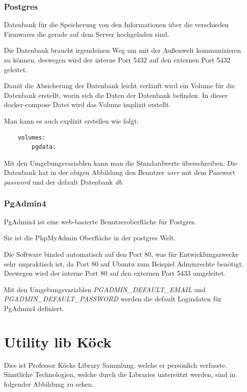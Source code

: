 \subsubsection{Postgres}

Datenbank für die Speicherung von den Informationen über die verschieden Firmwares die gerade auf dem Server hochgeladen sind.

Die Datenbank braucht irgendeinen Weg um mit der Außenwelt kommunizieren zu können, deswegen wird der interne Port 5432 auf den externen Port 5432 geleitet.

Damit die Absicherung der Datenbank leicht verläuft wird ein Volume für die Datenbank erstellt, worin sich die Daten der Datenbank befinden. In dieser docker-compose Datei wird das Volume implizit erstellt. 

Man kann es auch explizit erstellen wie folgt:

\begin{verbatim}
    volumes:
        pgdata:
\end{verbatim}

Mit den Umgebungsvariablen kann man die Standardwerte überschreiben. Die Datenbank hat in der obigen Abbildung den Benutzer \textit{user} mit dem Passwort \textit{password} und der default Datenbank \textit{db}.

\subsubsection{PgAdmin4}

PgAdmin4 ist eine web-basierte Benutzeroberfläche für Postgres.

Sie ist die PhpMyAdmin Oberfläche in der postgres Welt.

Die Software binded automatisch auf den Port 80, was für Entwicklungszwecke sehr unpraktisch ist, da Port 80 auf Ubuntu zum Beispiel Adminrechte benötigt. Deswegen wird der interne Port 80 auf den externen Port 5433 umgeleitet.

Mit den Umgebungsvariablen \textit{PGADMIN\_DEFAULT\_EMAIL} und 
\textit{PGADMIN\_DEFAULT\_PASSWORD} werden die default Logindaten für PgAdmin4 definiert. 
\pagebreak

\section{Utility lib Köck}\label{sec:utility-lib-koeck}
Dies ist Professor Köcks Library Sammlung, welche er persönlich verfasste. Sämtliche Technologien, welche durch die Libraries untersützt werden, sind in folgender Abbildung zu sehen.

